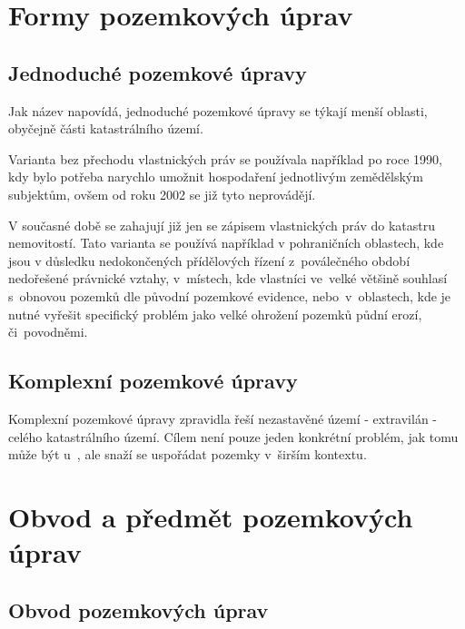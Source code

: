 \section{Formy pozemkových úprav}
\label{formy_pu}

\subsection{Jednoduché pozemkové úpravy}
\label{jednoduche_pu}

Jak název napovídá, jednoduché pozemkové úpravy se týkají menší oblasti, obyčejně části katastrálního území.

Varianta  bez přechodu vlastnických práv se používala například po roce 1990, kdy bylo potřeba narychlo umožnit hospodaření jednotlivým zemědělským subjektům, ovšem od roku 2002 se již tyto  neprovádějí.

V současné době se zahajují již jen  se zápisem vlastnických práv do katastru nemovitostí. Tato varianta  se používá například v pohraničních oblastech, kde jsou v důsledku nedokončených přídělových řízení z~poválečného období nedořešené právnické vztahy, v~místech, kde vlastníci ve~velké většině souhlasí s~obnovou pozemků dle původní pozemkové evidence, nebo~v~oblastech, kde je nutné vyřešit specifický problém jako velké ohrožení pozemků půdní erozí, či~povodněmi.

\subsection{Komplexní pozemkové úpravy}
\label{komplexní_pu}

Komplexní pozemkové úpravy zpravidla řeší nezastavěné území - extravilán - celého katastrálního území. Cílem  není pouze jeden konkrétní problém, jak tomu může být u~, ale snaží se uspořádat pozemky v~širším kontextu. 

\section{Obvod a předmět pozemkových úprav}
\label{obvod_a_predmet_pu}

\subsection{Obvod pozemkových úprav}
\label{obvod_pu}

